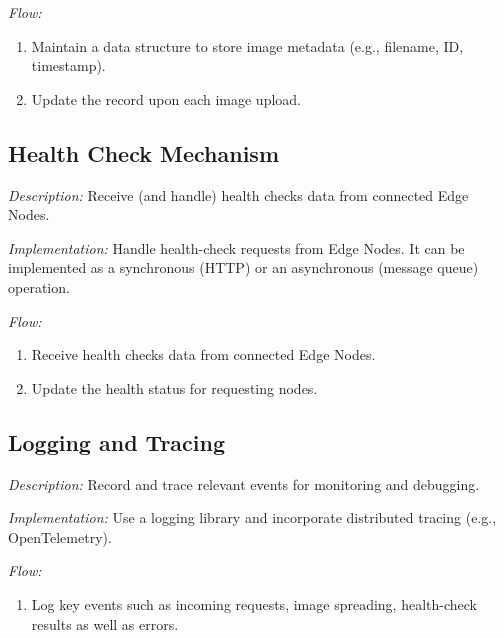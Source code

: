 \documentclass{article}
\begin{document}
  \textit{Flow:}
  \begin{enumerate}[label=\arabic*.]
    \item Maintain a data structure to store image metadata (e.g., filename, ID, timestamp).

    \item Update the record upon each image upload.
  \end{enumerate}



  \subsection{Health Check Mechanism}

  \textit{Description:} Receive (and handle) health checks data from connected Edge Nodes.

  \textit{Implementation:} Handle health-check requests from Edge Nodes. It can be implemented as a synchronous (HTTP)
  or an asynchronous  (message queue) operation.

  \textit{Flow:}
  \begin{enumerate}[label=\arabic*.]
    \item Receive health checks data from connected Edge Nodes.

    \item Update the health status for requesting nodes.
  \end{enumerate}



  \subsection{Logging and Tracing}

  \textit{Description:} Record and trace relevant events for monitoring and debugging.

  \textit{Implementation:} Use a logging library and incorporate distributed tracing (e.g., OpenTelemetry).

  \textit{Flow:}
  \begin{enumerate}[label=\arabic*.]
    \item Log key events such as incoming requests, image spreading, health-check results as well as errors.
  \end{enumerate}









  \newpage
\end{document}
